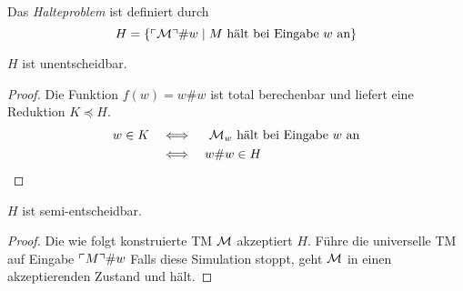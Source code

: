 \begin{Def}[name={[Halteproblem]}]
	Das \emph{Halteproblem} ist definiert durch
	\[H = \{\ulcorner \mathcal{M} \urcorner\# w \mid M \text{ hält bei Eingabe } w \text{ an}\} \qedhere\]
\end{Def}
\begin{Satz}[name={[$H$ ist unentscheidbar]}]\label{satz:H ist unentscheidbar}
	$H$ ist unentscheidbar.
\end{Satz}
\begin{proof}
  Die Funktion $f (w) = w\#w$ ist total berechenbar und liefert eine
  Reduktion  $K \preceq H$.
  \begin{align*}
   w \in K & \quad\Longleftrightarrow\quad \text{ $\mathcal{M}_w$ hält bei Eingabe $w$ an}\\
   & \quad\Longleftrightarrow\quad w\#w \in H \qedhere
  \end{align*}
\end{proof}
\begin{Satz}[name={[$H$ ist semi-entscheidbar]}]
	$H$ ist semi-entscheidbar.
\end{Satz}
\begin{proof}
  Die wie folgt konstruierte \ac{TM} $\mathcal{M}$ akzeptiert $H$.
  Führe die universelle \ac{TM} auf Eingabe $\ulcorner M \urcorner\#w$
  Falls diese Simulation stoppt, geht $\mathcal{M}$ in einen akzeptierenden Zustand und hält.
\end{proof}


